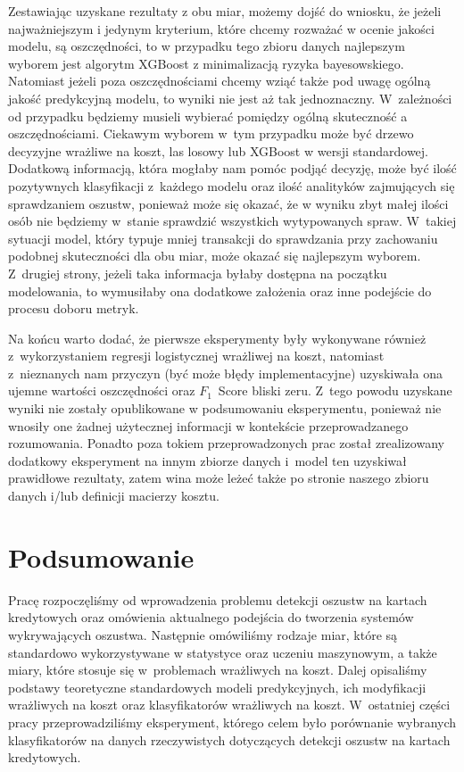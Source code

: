 \documentclass[inzynierska]{pwr_wmat_praca_dyplomowa}
\theoremstyle{plain}
\numberwithin{theorem}{chapter}
\theoremstyle{definition}
\numberwithin{theorem}{chapter}
\begin{document}
Zestawiając uzyskane rezultaty z obu miar, możemy dojść do wniosku, że jeżeli najważniejszym i jedynym kryterium, które chcemy rozważać w ocenie jakości modelu, są oszczędności, to w przypadku tego zbioru danych najlepszym wyborem jest algorytm XGBoost z minimalizacją ryzyka bayesowskiego. Natomiast jeżeli poza oszczędnościami chcemy wziąć także pod uwagę ogólną jakość predykcyjną modelu, to wyniki nie jest aż tak jednoznaczny. W~zależności od przypadku będziemy musieli wybierać pomiędzy ogólną skuteczność a oszczędnościami. Ciekawym wyborem w~tym przypadku może być drzewo decyzyjne wrażliwe na koszt, las losowy lub XGBoost w wersji standardowej. Dodatkową informacją, która mogłaby nam pomóc podjąć decyzję, może być ilość pozytywnych klasyfikacji z~każdego modelu oraz ilość analityków zajmujących się sprawdzaniem oszustw, ponieważ może się okazać, że w wyniku zbyt małej ilości osób nie będziemy w~stanie sprawdzić wszystkich wytypowanych spraw. W~takiej sytuacji model, który typuje mniej transakcji do sprawdzania przy zachowaniu podobnej skuteczności dla obu miar, może okazać się najlepszym wyborem. Z~drugiej strony, jeżeli taka informacja byłaby dostępna na początku modelowania, to wymusiłaby ona dodatkowe założenia oraz inne podejście do procesu doboru metryk.

Na końcu warto dodać, że pierwsze eksperymenty były wykonywane również z~wykorzystaniem regresji logistycznej wrażliwej na koszt, natomiast z~nieznanych nam przyczyn (być może błędy implementacyjne) uzyskiwała ona ujemne wartości oszczędności oraz $F_1$~Score bliski zeru. Z~tego powodu uzyskane wyniki nie zostały opublikowane w podsumowaniu eksperymentu, ponieważ nie wnosiły one żadnej użytecznej informacji w kontekście przeprowadzanego rozumowania. Ponadto poza tokiem przeprowadzonych prac został zrealizowany dodatkowy eksperyment na innym zbiorze danych i~model ten uzyskiwał prawidłowe rezultaty, zatem wina może leżeć także po stronie naszego zbioru danych i/lub definicji macierzy kosztu.

\chapter*{Podsumowanie}
Pracę rozpoczęliśmy od wprowadzenia problemu detekcji oszustw na kartach kredytowych oraz omówienia aktualnego podejścia do tworzenia systemów wykrywających oszustwa. Następnie omówiliśmy rodzaje miar, które są standardowo wykorzystywane w statystyce oraz uczeniu maszynowym, a także miary, które stosuje się w~problemach wrażliwych na koszt. Dalej opisaliśmy podstawy teoretyczne standardowych modeli predykcyjnych, ich modyfikacji wrażliwych na koszt oraz klasyfikatorów wrażliwych na koszt. W~ostatniej części pracy przeprowadziliśmy eksperyment, którego celem było porównanie wybranych klasyfikatorów na danych rzeczywistych dotyczących detekcji oszustw na kartach kredytowych.
\end{document}
